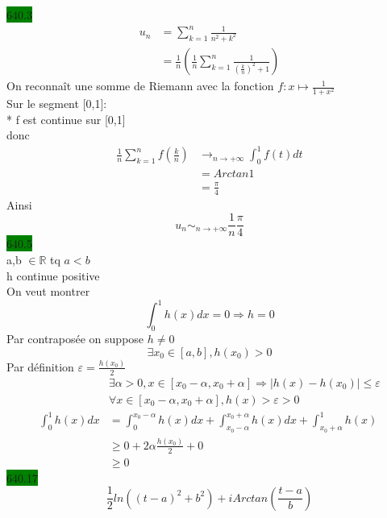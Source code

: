 \documentclass{article}
\begin{document}
\noindent \colorbox{green}{640.3} \begin{align*}
    u_n &= \sum_{k=1}^{n}\frac{1}{n^2+k^2}\\
    &= \frac{1}{n}(\frac{1}{n}\sum_{k=1}^{n}\frac{1}{(\frac{k}{n})^2 + 1})
\end{align*}
On reconnaît une somme de Riemann avec la fonction \(f : x \mapsto \frac{1}{1+x^2}\)\\
Sur le segment [0,1]:\\
* f est continue sur [0,1]\\
donc \begin{align*}
    \frac{1}{n}\sum_{k=1}^{n}f(\frac{k}{n}) &\rightarrow_{n\to +\infty} \int_{0}^{1}f(t)dt\\
    &= Arctan 1\\
    &= \frac{\pi}{4}
\end{align*}
Ainsi \begin{equation*}
    u_n \sim_{n\to +\infty}\frac{1}{n}\frac{\pi}{4}
\end{equation*}
\colorbox{green}{640.5}\\
a,b \(\in \mathbb{R}\) tq \(a < b\)\\
h continue positive\\
On veut montrer \begin{equation*}
    \int_{0}^{1}h(x)dx = 0 \Rightarrow h = 0
\end{equation*}
Par contraposée on suppose \(h \neq 0\)\\
\begin{equation*}
    \exists x_0 \in [a,b], h(x_0) > 0
\end{equation*}
Par définition \(\varepsilon = \frac{h(x_0)}{2}\)\begin{align*}
    &\exists \alpha > 0, x \in [x_0-\alpha, x_0 + \alpha] \Rightarrow |h(x)-h(x_0)| \leq \varepsilon\\
    & \forall x \in [x_0-\alpha, x_0 + \alpha], h(x)>\varepsilon > 0\\
    \int_{0}^{1} h(x)dx &= \int_{0}^{x_0-\alpha} h(x) dx + \int_{x_0-\alpha}^{x_0+\alpha} h(x) dx + \int_{x_0+\alpha}^{1} h(x)\\
    &\geq 0 + 2\alpha \frac{h(x_0)}{2} + 0\\
    &\geq 0
\end{align*}
\colorbox{green}{640.17}\\
\begin{equation*}
    \frac{1}{2}ln((t-a)^2+b^2) + iArctan(\frac{t-a}{b})
\end{equation*}
\end{document}
